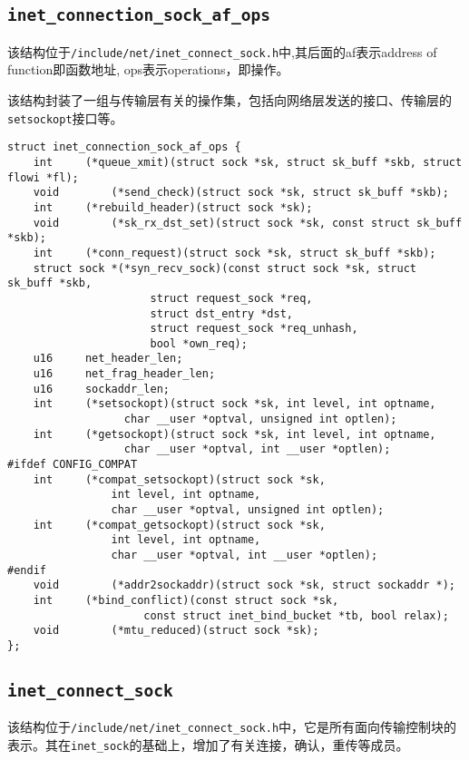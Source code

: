         \subsection{\texttt{inet_connection_sock_af_ops}}

            该结构位于\texttt{/include/net/inet_connect_sock.h}中,其后面的af表示address of function即函数地址, ops表示operations，即操作。

            该结构封装了一组与传输层有关的操作集，包括向网络层发送的接口、传输层的\texttt{setsockopt}接口等。

\begin{verbatim}
struct inet_connection_sock_af_ops {
    int     (*queue_xmit)(struct sock *sk, struct sk_buff *skb, struct flowi *fl);
    void        (*send_check)(struct sock *sk, struct sk_buff *skb);
    int     (*rebuild_header)(struct sock *sk);
    void        (*sk_rx_dst_set)(struct sock *sk, const struct sk_buff *skb);
    int     (*conn_request)(struct sock *sk, struct sk_buff *skb);
    struct sock *(*syn_recv_sock)(const struct sock *sk, struct sk_buff *skb,
                      struct request_sock *req,
                      struct dst_entry *dst,
                      struct request_sock *req_unhash,
                      bool *own_req);
    u16     net_header_len;
    u16     net_frag_header_len;
    u16     sockaddr_len;
    int     (*setsockopt)(struct sock *sk, int level, int optname, 
                  char __user *optval, unsigned int optlen);
    int     (*getsockopt)(struct sock *sk, int level, int optname, 
                  char __user *optval, int __user *optlen);
#ifdef CONFIG_COMPAT
    int     (*compat_setsockopt)(struct sock *sk,
                int level, int optname,
                char __user *optval, unsigned int optlen);
    int     (*compat_getsockopt)(struct sock *sk,
                int level, int optname,
                char __user *optval, int __user *optlen);
#endif
    void        (*addr2sockaddr)(struct sock *sk, struct sockaddr *);
    int     (*bind_conflict)(const struct sock *sk,
                     const struct inet_bind_bucket *tb, bool relax);
    void        (*mtu_reduced)(struct sock *sk);
};
\end{verbatim}

        \subsection{\texttt{inet_connect_sock}}

            该结构位于\texttt{/include/net/inet_connect_sock.h}中，它是所有面向传输控制块的表示。其在\texttt{inet_sock}的基础上，增加了有关连接，确认，重传等成员。
            
